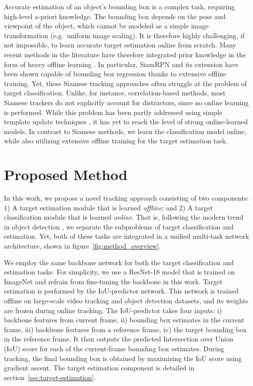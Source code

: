 \documentclass[10pt,twocolumn,letterpaper]{article}
\begin{document}
Accurate estimation of an object's bounding box is a complex task, requiring high-level a-priori knowledge. The bounding box depends on the pose and viewpoint of the object, which cannot be modeled as a simple image transformation (e.g.\ uniform image scaling). It is therefore highly challenging, if not impossible, to learn accurate target estimation online from scratch. Many recent methods in the literature have therefore integrated prior knowledge in the form of heavy offline learning \cite{SiamRPN,MDNet,DaSiamRPN}. In particular, SiamRPN \cite{SiamRPN} and its extension \cite{DaSiamRPN} have been shown capable of bounding box regression thanks to extensive offline training. Yet, these Siamese tracking approaches often struggle at the problem of target classification. Unlike, for instance, correlation-based methods, most Siamese trackers do not explicitly account for distractors, since no online learning is performed. While this problem has been partly addressed using simple template update techniques \cite{DaSiamRPN}, it has yet to reach the level of strong online-learned models. In contrast to Siamese methods, we learn the classification model online, while also utilizing extensive offline training for the target estimation task.
 \section{Proposed Method}


In this work, we propose a novel tracking approach consisting of two components: 1) A target estimation module that is learned \emph{offline}; and 2) A target classification module that is learned \emph{online}. That is, following the modern trend in object detection \cite{YOLO9000,FasterRCNN}, we separate the subproblems of target classification and estimation. Yet, both of these tasks are integrated in a unified multi-task network architecture, shown in figure~\ref{fig:method_overview}.

We employ the same backbone network for both the target classification and estimation tasks. For simplicity, we use a ResNet-18 model that is trained on ImageNet and refrain from fine-tuning the backbone in this work. Target estimation is performed by the IoU-predictor network. This network is trained offline on large-scale video tracking and object detection datasets, and its weights are frozen during online tracking. The IoU-predictor takes four inputs: i) backbone features from current frame, ii) bounding box estimates in the current frame, iii) backbone features from a reference frame, iv) the target bounding box in the reference frame. It then outputs the predicted Intersection over Union (IoU) score for each of the current-frame bounding box estimates. During tracking, the final bounding box is obtained by maximizing the IoU score using gradient ascent. The target estimation component is detailed in section~\ref{sec:target-estimation}.
\end{document}
